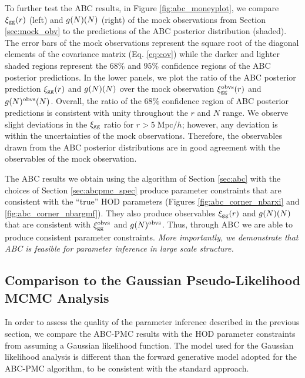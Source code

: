 To further test the ABC results, in Figure \ref{fig:abc_moneyplot}, 
we compare $\xi_{\mathrm{gg}}(r)$ (left) and $g(N)(N)$ (right) of the mock observations from Section \ref{sec:mock_obv}
to the predictions of the ABC posterior distribution (shaded). The error bars of the mock observations 
represent the square root of the diagonal elements of the covariance matrix (Eq. \ref{eq:cov}) while the 
darker and lighter shaded regions represent the $68\%$ and $95\%$ confidence regions of the ABC posterior 
predictions. In the lower panels, we plot the ratio of the ABC posterior prediction $\xi_{\mathrm{gg}}(r)$ and $g(N)(N)$ over
the mock observation $\xi_{\mathrm{gg}}^\mathrm{obvs}(r)$ and $g(N)^\mathrm{obvs}(N)$. Overall, the 
ratio of the $68\%$ confidence region of ABC posterior predictions is consistent with unity 
throughout the $r$ and $N$ range. We observe slight deviations in the $\xi_{\mathrm{gg}}$ ratio for 
$r > 5\;\mathrm{Mpc}/h$; however, any deviation is within the uncertainties of the mock observations. 
Therefore, the observables drawn from the ABC posterior distributions are in good agreement with the
observables of the mock observation. 

The ABC results we obtain using the algorithm of Section \ref{sec:abc} with the choices of
Section \ref{sec:abcpmc_spec} produce parameter constraints that are consistent with 
the ``true'' HOD parameters (Figures \ref{fig:abc_corner_nbarxi} and \ref{fig:abc_corner_nbargmf}).
They also produce observables $\xi_{\mathrm{gg}}(r)$ and $g(N)(N)$ that are consistent with $\xi_{\mathrm{gg}}^\mathrm{obvs}$ 
and $g(N)^\mathrm{obvs}$. Thus, through ABC we are able to produce consistent 
parameter constraints. {\em More importantly, we demonstrate that ABC is feasible 
for parameter inference in large scale structure.} %

\subsection{Comparison to the Gaussian Pseudo-Likelihood MCMC Analysis} \label{sec:abcvsmcmc}
In order to assess the quality of the parameter inference described in the previous section, 
we compare the ABC-PMC results with the HOD parameter constraints from
assuming a Gaussian likelihood 
function. The model used for the Gaussian likelihood analysis is different than the forward 
generative model adopted for the ABC-PMC algorithm, to be consistent with the standard approach.

